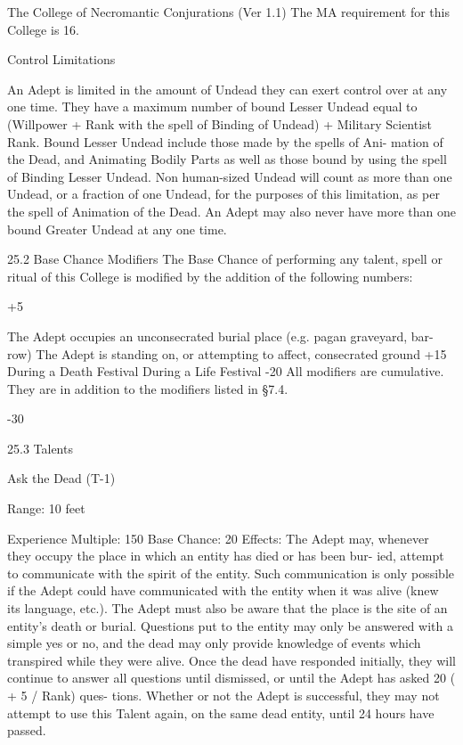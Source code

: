 \begin{Chapter}{The College of Necromantic Conjurations (Ver 1.1)}
The MA requirement for this College is 16. 

Control Limitations 

An Adept is limited in the amount of Undead they 
can exert control over at any one time. They have a 
maximum  number  of  bound  Lesser  Undead  equal 
to (Willpower + Rank with the spell of Binding of 
Undead)  +  Military  Scientist  Rank.  Bound  Lesser 
Undead  include  those  made  by  the  spells  of  Ani-
mation of the Dead, and Animating Bodily Parts as 
well  as  those  bound  by  using  the  spell  of  Binding 
Lesser  Undead.  Non  human-sized  Undead  will 
count  as  more  than  one  Undead,  or  a  fraction  of 
one Undead, for the purposes of this limitation, as 
per  the  spell  of  Animation  of  the  Dead.  An  Adept 
may also never have more than one bound Greater 
Undead at any one time. 

25.2 Base Chance Modifiers 
The Base Chance of performing any talent, spell or 
ritual of this College is modified by the addition of 
the following numbers:  

+5%

The Adept occupies an unconsecrated 
burial place (e.g. pagan graveyard, bar-
row) 
The Adept is standing on, or attempting 
to affect, consecrated ground 
+15%
During a Death Festival 
During a Life Festival 
-20%
All modifiers are cumulative. They are in addition 
to the modifiers listed in §7.4. 

-30%

25.3 Talents 

Ask the Dead (T-1) 

Range: 10 feet 

Experience Multiple: 150 
Base Chance: 20%
Effects: The Adept may, whenever they occupy the 
place in which an entity has died or has been bur-
ied,  attempt  to  communicate  with  the  spirit  of  the 
entity.  Such  communication  is  only  possible  if  the 
Adept  could  have  communicated  with  the  entity 
when  it  was  alive  (knew  its  language,  etc.).  The 
Adept must also be aware that the place is the site 
of an entity’s death or burial. Questions put to the 
entity  may  only  be  answered  with  a  simple  yes  or 
no,  and  the  dead  may  only  provide  knowledge  of 
events  which  transpired  while  they  were  alive. 
Once  the  dead  have  responded  initially,  they  will 
continue to answer all questions until dismissed, or 
until  the  Adept  has  asked  20  (  +  5  /  Rank)  ques-
tions. Whether or not the Adept is successful, they 
may  not  attempt  to  use  this  Talent  again,  on  the 
same dead entity, until 24 hours have passed. 


\end{Chapter}
